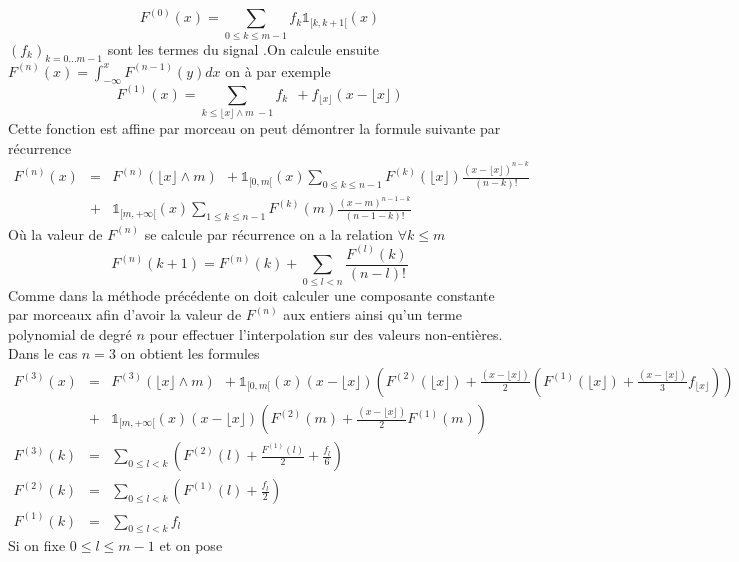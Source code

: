 \begin{equation*}
F^{(0)} (x) =\underset{0\le k \le m-1}{\sum}f_{k} \mathds{1}_{[k,k+1[}(x)
\end{equation*}
$(f_k)_{k=0...m-1}$ sont les termes du signal .On calcule ensuite $F^{(n)}(x)=\int_{-\infty}^{x}F^{(n-1)}(y)dx$ on à par exemple
\begin{equation*}
F^{(1)}(x)=\underset{k\le \lfloor x\rfloor \wedge m~-1}{\sum}f_{k}~~+ f_{\lfloor x\rfloor}
(x-\lfloor x\rfloor)
\end{equation*}
Cette fonction est affine par morceau on peut démontrer la formule suivante par récurrence
\begin{eqnarray*}
F^{(n)}(x) &=& F^{(n)}(\lfloor x\rfloor \wedge m)~~+\mathds{1}_{[0,m[}(x) \underset{0\le k \le n-1}{\sum}F^{(k)}(\lfloor x \rfloor) \frac{(x-\lfloor x \rfloor)^{n-k}}{(n-k)!}\\
          &+&\mathds{1}_{[m,+\infty[}(x)\underset{1\le k \le n-1}{\sum}F^{(k)}(m) \frac{(x-m)^{n-1-k}}{(n-1-k)!}
\end{eqnarray*}
Où la valeur de $F^{(n)}$ se calcule par récurrence on a la relation $\forall k\le m$
\begin{equation*}
F^{(n)}(k+1)=F^{(n)}(k)+\underset{0\le l < n}{\sum} \frac{F^{(l)}(k)}{(n-l)!}
\end{equation*}
Comme dans la méthode précédente on doit calculer une composante constante par morceaux afin d'avoir la valeur de $F^{(n)}$ aux entiers  ainsi qu'un terme polynomial de degré $n$ pour effectuer l'interpolation sur des valeurs non-entières.\\
Dans le cas $n=3$ on obtient les formules
\begin{eqnarray*}
F^{(3)}(x)&=&F^{(3)}(\lfloor x\rfloor \wedge m)~~+\mathds{1}_{[0,m[}(x)(x-\lfloor x \rfloor) \left(F^{(2)}(\lfloor x \rfloor)+ \frac{(x-\lfloor x \rfloor)}{2}\left(F^{(1)}(\lfloor x \rfloor)+\frac{(x-\lfloor x \rfloor)}{3} f_{\lfloor x \rfloor}\right)\right)\\
          &+&\mathds{1}_{[m,+\infty[}(x)(x-\lfloor x \rfloor) \left(F^{(2)}(m)+ \frac{(x-\lfloor x \rfloor)}{2}F^{(1)}(m)\right) \\
F^{(3)}(k)&=&  \underset{0\le l<k}{\sum}\left(F^{(2)}(l)+\frac{F^{(1)}(l)}{2}+\frac{f_{l}}{6} \right)  \\
F^{(2)}(k)&=&  \underset{0\le l<k}{\sum}\left(F^{(1)}(l)+\frac{f_{l}}{2} \right)  \\
F^{(1)}(k)&=&  \underset{0\le l<k}{\sum}f_{l} 
\end{eqnarray*}
Si on fixe $0\le l\le m-1$ et on pose
